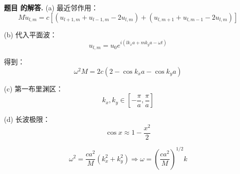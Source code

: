\documentclass[12pt, a4paper, oneside]{ctexart}
\newcounter{problemname}
\newenvironment{solution}
  {\par\noindent\textbf{题目 \theproblemname 的解答. }}
  {\par}
\begin{document}
\begin{solution}
    (a) 最近邻作用：
\[
M \ddot{u}_{l,m}
= c[(u_{l+1,m} + u_{l-1,m} - 2u_{l,m})
+ (u_{l,m+1} + u_{l,m-1} - 2u_{l,m})]
\]

(b) 代入平面波：
\[
u_{l,m} = u_0 e^{i(lk_x a + mk_y a - \omega t)}
\]

得到：
\[
\omega^2 M = 2c(2 - \cos k_x a - \cos k_y a)
\]

(c) 第一布里渊区：
\[
\boxed{k_x, k_y \in \left[-\frac{\pi}{a}, \frac{\pi}{a}\right]}
\]

(d) 长波极限：
\[
\cos x \approx 1 - \frac{x^2}{2}
\]

\[
\omega^2 = \frac{ca^2}{M}(k_x^2 + k_y^2)
\Rightarrow
\boxed{\omega = \left(\frac{ca^2}{M}\right)^{1/2} k}
\]
\end{solution}
\end{document}
